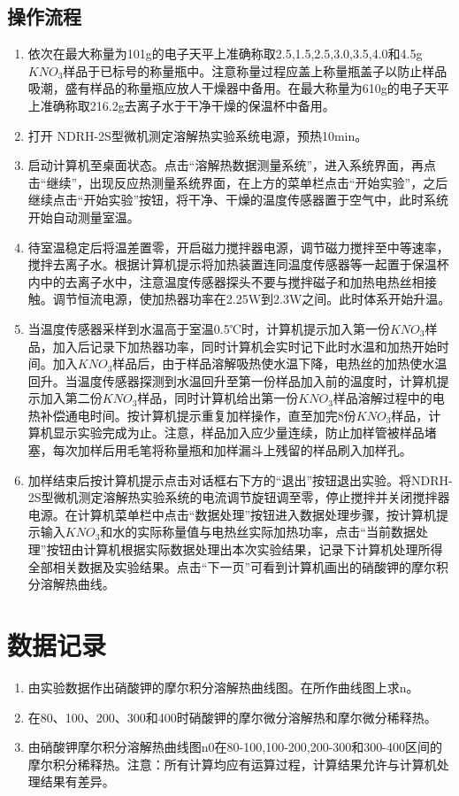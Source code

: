 \documentclass[UTF8]{ctexart}
\begin{document}
\subsection{操作流程}
\begin{enumerate}
    \item 依次在最大称量为101g的电子天平上准确称取2.5,1.5,2.5,3.0,3.5,4.0和4.5g$KNO_3$样品于已标号的称量瓶中。注意称量过程应盖上称量瓶盖子以防止样品吸潮，盛有样品的称量瓶应放人干燥器中备用。在最大称量为610g的电子天平上准确称取216.2g去离子水于干净干燥的保温杯中备用。
    \item 打开 NDRH-2S型微机测定溶解热实验系统电源，预热10min。
    \item 启动计算机至桌面状态。点击“溶解热数据测量系统”，进入系统界面，再点击“继续”，出现反应热测量系统界面，在上方的菜单栏点击“开始实验”，之后继续点击“开始实验”按钮，将干净、干燥的温度传感器置于空气中，此时系统开始自动测量室温。
    \item 待室温稳定后将温差置零，开启磁力搅拌器电源，调节磁力搅拌至中等速率，搅拌去离子水。根据计算机提示将加热装置连同温度传感器等一起置于保温杯内中的去离子水中，注意温度传感器探头不要与搅拌磁子和加热电热丝相接触。调节恒流电源，使加热器功率在2.25W到2.3W之间。此时体系开始升温。
    \item 当温度传感器采样到水温高于室温0.5℃时，计算机提示加入第一份$KNO_3$样品，加入后记录下加热器功率，同时计算机会实时记下此时水温和加热开始时间。加入$KNO_3$样品后，由于样品溶解吸热使水温下降，电热丝的加热使水温回升。当温度传感器探测到水温回升至第一份样品加入前的温度时，计算机提示加入第二份$KNO_3$样品，同时计算机给出第一份$KNO_3$样品溶解过程中的电热补偿通电时间。按计算机提示重复加样操作，直至加完8份$KNO_3$样品，计算机显示实验完成为止。注意，样品加入应少量连续，防止加样管被样品堵塞，每次加样后用毛笔将称量瓶和加样漏斗上残留的样品刷入加样孔。
    \item 加样结束后按计算机提示点击对话框右下方的“退出”按钮退出实验。将NDRH-2S型微机测定溶解热实验系统的电流调节旋钮调至零，停止搅拌并关闭搅拌器电源。在计算机菜单栏中点击“数据处理”按钮进入数据处理步骤，按计算机提示输入$KNO_3$和水的实际称量值与电热丝实际加热功率，点击“当前数据处理”按钮由计算机根据实际数据处理出本次实验结果，记录下计算机处理所得全部相关数据及实验结果。点击“下一页”可看到计算机画出的硝酸钾的摩尔积分溶解热曲线。
\end{enumerate}

\section{数据记录}
\begin{enumerate}
    \item 由实验数据作出硝酸钾的摩尔积分溶解热曲线图。在所作曲线图上求n。
    \item 在80、100、200、300和400时硝酸钾的摩尔微分溶解热和摩尔微分稀释热。
    \item 由硝酸钾摩尔积分溶解热曲线图n0在80-100,100-200,200-300和300-400区间的摩尔积分稀释热。注意：所有计算均应有运算过程，计算结果允许与计算机处理结果有差异。
    
\end{enumerate}
\end{document}

